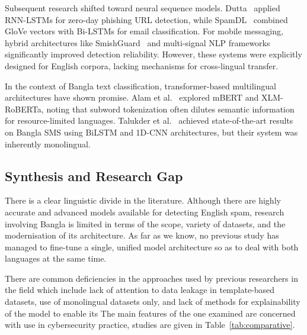\documentclass[journal]{IEEEtran}
\begin{document}
Subsequent research shifted toward neural sequence models. Dutta~\cite{ref3} applied RNN-LSTMs for zero-day phishing URL detection, while SpamDL~\cite{ref9} combined GloVe vectors with Bi-LSTMs for email classification. For mobile messaging, hybrid architectures like SmishGuard~\cite{ref6} and multi-signal NLP frameworks~\cite{ref10} significantly improved detection reliability. However, these systems were explicitly designed for English corpora, lacking mechanisms for cross-lingual transfer.

In the context of Bangla text classification, transformer-based multilingual architectures have shown promise. Alam et al.~\cite{ref4} explored mBERT and XLM-RoBERTa, noting that subword tokenization often dilutes semantic information for resource-limited languages. Talukder et al.~\cite{ref7} achieved state-of-the-art results on Bangla SMS using BiLSTM and 1D-CNN architectures, but their system was inherently monolingual.

\subsection{Synthesis and Research Gap}

There is a clear linguistic divide in the literature. Although there are highly accurate and advanced models available for detecting English spam, research involving Bangla is limited in terms of the scope, variety of datasets, and the modernisation of its architecture. As far as we know, no previous study has managed to fine-tune a single, unified model architecture so as to deal with both languages at the same time.

There are common deficiencies in the approaches used by
previous researchers in the field which include lack of attention to
data leakage in template-based datasets, use of monolingual datasets
only, and lack of methods for explainability of the model to enable its
The main features of the one examined are concerned with use in cybersecurity practice,
studies are given in Table~\ref{tab:comparative}.
\end{document}
